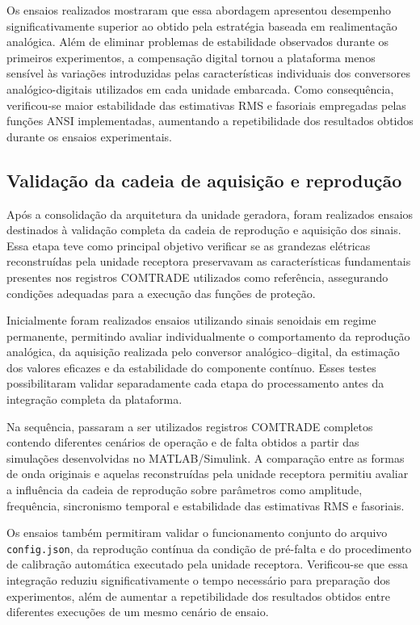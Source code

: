 Os ensaios realizados mostraram que essa abordagem apresentou desempenho significativamente superior ao obtido pela estratégia baseada em realimentação analógica. Além de eliminar problemas de estabilidade observados durante os primeiros experimentos, a compensação digital tornou a plataforma menos sensível às variações introduzidas pelas características individuais dos conversores analógico-digitais utilizados em cada unidade embarcada. Como consequência, verificou-se maior estabilidade das estimativas RMS e fasoriais empregadas pelas funções ANSI implementadas, aumentando a repetibilidade dos resultados obtidos durante os ensaios experimentais.

\subsection{Validação da cadeia de aquisição e reprodução}

Após a consolidação da arquitetura da unidade geradora, foram realizados ensaios destinados à validação completa da cadeia de reprodução e aquisição dos sinais. Essa etapa teve como principal objetivo verificar se as grandezas elétricas reconstruídas pela unidade receptora preservavam as características fundamentais presentes nos registros COMTRADE utilizados como referência, assegurando condições adequadas para a execução das funções de proteção.

Inicialmente foram realizados ensaios utilizando sinais senoidais em regime permanente, permitindo avaliar individualmente o comportamento da reprodução analógica, da aquisição realizada pelo conversor analógico--digital, da estimação dos valores eficazes e da estabilidade do componente contínuo. Esses testes possibilitaram validar separadamente cada etapa do processamento antes da integração completa da plataforma.

Na sequência, passaram a ser utilizados registros COMTRADE completos contendo diferentes cenários de operação e de falta obtidos a partir das simulações desenvolvidas no MATLAB/Simulink. A comparação entre as formas de onda originais e aquelas reconstruídas pela unidade receptora permitiu avaliar a influência da cadeia de reprodução sobre parâmetros como amplitude, frequência, sincronismo temporal e estabilidade das estimativas RMS e fasoriais.

Os ensaios também permitiram validar o funcionamento conjunto do arquivo \texttt{config.json}, da reprodução contínua da condição de pré-falta e do procedimento de calibração automática executado pela unidade receptora. Verificou-se que essa integração reduziu significativamente o tempo necessário para preparação dos experimentos, além de aumentar a repetibilidade dos resultados obtidos entre diferentes execuções de um mesmo cenário de ensaio.

